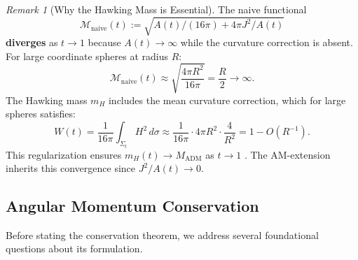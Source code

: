 \documentclass[12pt]{article}
\theoremstyle{plain}
\theoremstyle{definition}
\theoremstyle{remark}
\newtheorem{remark}[theorem]{Remark}
\newcommand{\ADM}{\mathrm{ADM}}
\begin{document}
\begin{remark}[Why the Hawking Mass is Essential]\label{rem:hawking-essential}
The naive functional 
\[
\mathcal{M}_{\text{naive}}(t) := \sqrt{A(t)/(16\pi) + 4\pi J^2/A(t)}
\]
\textbf{diverges} as $t \to 1$ because $A(t) \to \infty$ while the curvature correction is absent. For large coordinate spheres at radius $R$:
\[
\mathcal{M}_{\text{naive}}(t) \approx \sqrt{\frac{4\pi R^2}{16\pi}} = \frac{R}{2} \to \infty.
\]
The Hawking mass $m_H$ includes the mean curvature correction, which for large spheres satisfies:
\[
W(t) = \frac{1}{16\pi}\int_{\Sigma_t} H^2 \, d\sigma \approx \frac{1}{16\pi} \cdot 4\pi R^2 \cdot \frac{4}{R^2} = 1 - O(R^{-1}).
\]
This regularization ensures $m_H(t) \to M_{\ADM}$ as $t \to 1$ \cite{huisken2001, amo2022}. The AM-extension inherits this convergence since $J^2/A(t) \to 0$.
\end{remark}

\subsection{Angular Momentum Conservation}

Before stating the conservation theorem, we address several foundational questions about its formulation.
\end{document}
